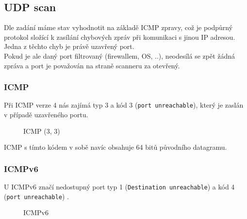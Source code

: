 \documentclass[11pt, a4paper]{article}
\begin{document}
\subsection{UDP scan}
Dle zadání máme stav vyhodnotit na základě ICMP zpravy, což je podpůrný protokol složící k zasílání chybových zpráv při komunikaci s jinou IP adresou.
Jedna z těchto chyb je právě uzavřený port.\\

Pokud je ale daný port filtrovaný (firewallem, OS, ..), neodesílá se zpět žádná zpráva a port je považován na straně scanneru za otevřený.\\

\subsubsection*{ICMP}
Při ICMP verze 4 nás zajímá typ 3 a kód 3 (\texttt{port unreachable}), který je zaslán v případě uzavřeného portu.\\

\begin{figure}[ht]
	\begin{center}
	\caption{ICMP (3, 3)}
	\end{center}
\end{figure}

ICMP s tímto kódem v sobě navíc obsahuje 64 bitů původního datagramu.\cite{icmp}

\newpage

\subsubsection*{ICMPv6}
U ICMPv6 značí nedostupný port typ 1 (\texttt{Destination unreachable}) a kód 4 (\texttt{port unreachable}) \cite{icmp6}.

\begin{figure}[ht]
	\begin{center}
	\caption{ICMPv6}
	\end{center}
\end{figure}
\end{document}

